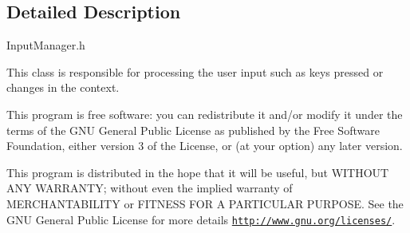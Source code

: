 \subsection{Detailed Description}
Input\-Manager.\-h

This class is responsible for processing the user input such as keys pressed or changes in the context.

This program is free software\-: you can redistribute it and/or modify it under the terms of the G\-N\-U General Public License as published by the Free Software Foundation, either version 3 of the License, or (at your option) any later version.

This program is distributed in the hope that it will be useful, but W\-I\-T\-H\-O\-U\-T A\-N\-Y W\-A\-R\-R\-A\-N\-T\-Y; without even the implied warranty of M\-E\-R\-C\-H\-A\-N\-T\-A\-B\-I\-L\-I\-T\-Y or F\-I\-T\-N\-E\-S\-S F\-O\-R A P\-A\-R\-T\-I\-C\-U\-L\-A\-R P\-U\-R\-P\-O\-S\-E. See the G\-N\-U General Public License for more details \href{http://www.gnu.org/licenses/}{\tt http\-://www.\-gnu.\-org/licenses/}. 

